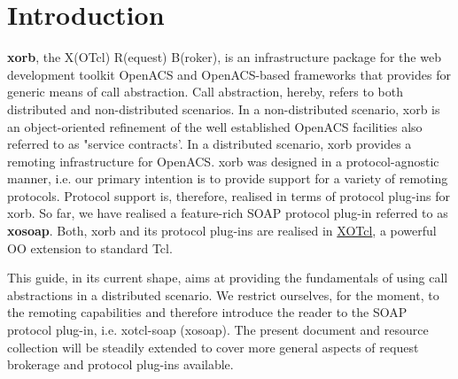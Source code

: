      \section{Introduction}\label{sec:introduction}
        \textbf{xorb}, the X(OTcl) R(equest) B(roker), is an 
infrastructure package for the web development toolkit OpenACS and OpenACS-based frameworks that 
provides for generic means of call abstraction.  Call abstraction, hereby, refers to both distributed and 
non-distributed scenarios. In a non-distributed scenario, xorb is an object-oriented refinement of the well 
established OpenACS facilities also referred to as "service contracts'. In a distributed scenario, xorb 
provides a remoting infrastructure for OpenACS. xorb was designed in a protocol-agnostic manner, i.e. 
our primary intention is to provide support for a variety of remoting protocols. Protocol support is, 
therefore, realised in terms of protocol plug-ins for xorb. So far, we have realised a feature-rich SOAP 
protocol plug-in referred to as \textbf{xosoap}. Both, xorb and its protocol plug-ins are realised in \href{http://media.wu-wien.ac.at/}{XOTcl}, a powerful OO extension to standard Tcl.

This guide, in its current shape, aims at providing the fundamentals of using call abstractions in a 
distributed scenario. We restrict ourselves, for the moment, to the remoting capabilities and therefore 
introduce the reader to the SOAP protocol plug-in, i.e. xotcl-soap (xosoap). The present document and 
resource collection will be steadily extended to cover more general aspects of request brokerage and 
protocol plug-ins available.
